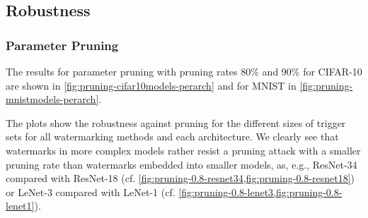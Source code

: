 

\clearpage

\subsection{Robustness} \label{sec:eval-robustness}

\subsubsection{Parameter Pruning} \label{sec:eval-robustness-pruning}




% 
%

The results for parameter pruning with pruning rates $80\%$ and $90\%$ for CIFAR-10 are shown in \cref{fig:pruning-cifar10models-perarch} and for MNIST in \cref{fig:pruning-mnistmodels-perarch}.

The plots show the robustness against pruning for the different sizes of trigger sets for all watermarking methods and each architecture. We clearly see that watermarks in more complex models rather resist a pruning attack with a smaller pruning rate than watermarks embedded into smaller models, as, e.g., ResNet-34 compared with ResNet-18 (cf. \cref{fig:pruning-0.8-resnet34,fig:pruning-0.8-resnet18}) or LeNet-3 compared with LeNet-1 (cf. \cref{fig:pruning-0.8-lenet3,fig:pruning-0.8-lenet1}).

